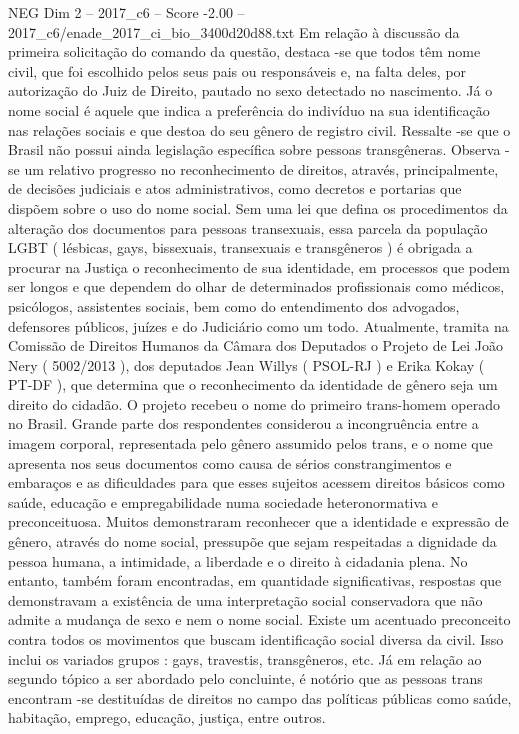 \begin{textsample}{NEG Dim 2 – 2017\_c6 – Score -2.00 – 2017\_c6/enade\_2017\_ci\_bio\_3400d20d88.txt}
Em relação à discussão da primeira solicitação do comando da questão, destaca -se que todos têm nome civil, que foi escolhido pelos seus pais ou responsáveis e, na falta deles, por autorização do Juiz de Direito, pautado no sexo detectado no nascimento.
Já o nome social é aquele que indica a preferência do indivíduo na sua identificação nas relações sociais e que destoa do seu gênero de registro civil.
Ressalte -se que o Brasil não possui ainda legislação específica sobre pessoas transgêneras.
Observa -se um relativo progresso no reconhecimento de direitos, através, principalmente, de decisões judiciais e atos administrativos, como decretos e portarias que dispõem sobre o uso do nome social.
Sem uma lei que defina os procedimentos da alteração dos documentos para pessoas transexuais, essa parcela da população LGBT ( lésbicas, gays, bissexuais, transexuais e transgêneros ) é obrigada a procurar na Justiça o reconhecimento de sua identidade, em processos que podem ser longos e que dependem do olhar de determinados profissionais como médicos, psicólogos, assistentes sociais, bem como do entendimento dos advogados, defensores públicos, juízes e do Judiciário como um todo.
Atualmente, tramita na Comissão de Direitos Humanos da Câmara dos Deputados o Projeto de Lei João Nery ( 5002/2013 ), dos deputados Jean Willys ( PSOL-RJ ) e Erika Kokay ( PT-DF ), que determina que o reconhecimento da identidade de gênero seja um direito do cidadão.
O projeto recebeu o nome do primeiro trans-homem operado no Brasil.
Grande parte dos respondentes considerou a incongruência entre a imagem corporal, representada pelo gênero assumido pelos trans, e o nome que apresenta nos seus documentos como causa de sérios constrangimentos e embaraços e as dificuldades para que esses sujeitos acessem direitos básicos como saúde, educação e empregabilidade numa sociedade heteronormativa e preconceituosa.
Muitos demonstraram reconhecer que a identidade e expressão de gênero, através do nome social, pressupõe que sejam respeitadas a dignidade da pessoa humana, a intimidade, a liberdade e o direito à cidadania plena.
No entanto, também foram encontradas, em quantidade significativas, respostas que demonstravam a existência de uma interpretação social conservadora que não admite a mudança de sexo e nem o nome social.
Existe um acentuado preconceito contra todos os movimentos que buscam identificação social diversa da civil.
Isso inclui os variados grupos : gays, travestis, transgêneros, etc.
Já em relação ao segundo tópico a ser abordado pelo concluinte, é notório que as pessoas trans encontram -se destituídas de direitos no campo das políticas públicas como saúde, habitação, emprego, educação, justiça, entre outros.

\end{textsample}

